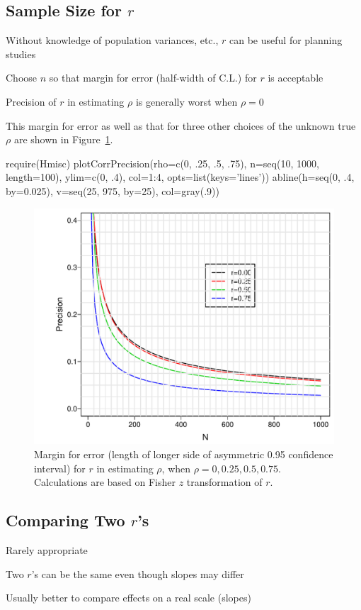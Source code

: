 \subsection{Sample Size for $r$}
\bi
\item Without knowledge of population variances, etc., $r$ can be
  useful for planning studies
\item Choose $n$ so that margin for error (half-width of C.L.) for $r$
  is acceptable
\item Precision of $r$ in estimating $\rho$ is generally worst when $\rho=0$
\item This margin for error as well as that for three other choices of the unknown true $\rho$ are shown in Figure~\ref{fig:corr-moe}.
\begin{Schunk}
\begin{Sinput}
require(Hmisc)
plotCorrPrecision(rho=c(0, .25, .5, .75),
                  n=seq(10, 1000, length=100),
                  ylim=c(0, .4), col=1:4, opts=list(keys='lines'))
abline(h=seq(0, .4, by=0.025),
       v=seq(25, 975, by=25), col=gray(.9))
\end{Sinput}
\begin{figure}[htbp]

\centerline{\includegraphics[width=\maxwidth]{corr-moe-1} }

\caption[Margin of error for estimating correlation coefficient]{Margin for error (length of longer side of asymmetric 0.95 confidence interval) for $r$ in estimating $\rho$, when $\rho=0, 0.25, 0.5, 0.75$.  Calculations are based on Fisher $z$ transformation of $r$.}\label{fig:corr-moe}
\end{figure}
\end{Schunk}
\ei

\subsection{Comparing Two $r$'s}
\bi
\item Rarely appropriate
\item Two $r$'s can be the same even though slopes may differ
\item Usually better to compare effects on a real scale (slopes)
\ei
